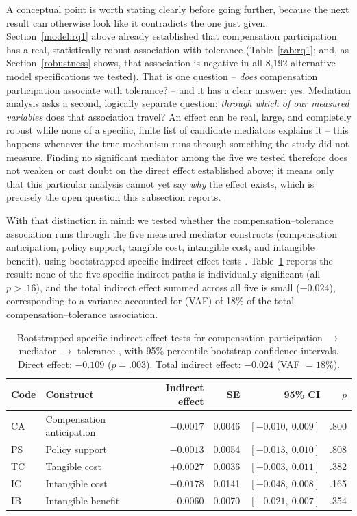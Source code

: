 A conceptual point is worth stating clearly before going further, because
the next result can otherwise look like it contradicts the one just given.
Section~\ref{model:rq1} above already established that compensation
participation has a real, statistically robust association with tolerance
(Table~\ref{tab:rq1}; and, as Section~\ref{robustness} shows, that association
is negative in all 8{,}192 alternative model specifications we tested). That
is one question -- \emph{does} compensation participation associate with
tolerance? -- and it has a clear answer: yes. Mediation analysis asks a
second, logically separate question: \emph{through which of our measured
variables} does that association travel? An effect can be real, large, and
completely robust while none of a specific, finite list of candidate
mediators explains it -- this happens whenever the true mechanism runs
through something the study did not measure. Finding no significant
mediator among the five we tested therefore does not weaken or cast doubt on
the direct effect established above; it means only that this particular
analysis cannot yet say \emph{why} the effect exists, which is precisely the
open question this subsection reports.

With that distinction in mind: we tested whether the compensation--tolerance
association runs through the five measured mediator constructs
(compensation anticipation, policy support, tangible cost, intangible cost,
and intangible benefit), using bootstrapped specific-indirect-effect tests
\citep{Nitzl2016}. Table~\ref{tab:mediation} reports the result: none of the
five specific indirect paths is individually significant (all $p > .16$),
and the total indirect effect summed across all five is small ($-0.024$),
corresponding to a variance-accounted-for (VAF) of 18\% of the total
compensation--tolerance association.

\begin{table}[htbp]
\centering
\caption{Bootstrapped specific-indirect-effect tests for compensation
participation $\rightarrow$ mediator $\rightarrow$ tolerance
\citep{Nitzl2016}, with 95\% percentile bootstrap confidence intervals.
Direct effect: $-0.109$ ($p=.003$). Total indirect effect: $-0.024$
(VAF $=18\%$).}
\label{tab:mediation}
\begin{tabular}{llrrrr}
\hline
\textbf{Code} & \textbf{Construct} & \textbf{Indirect effect} & \textbf{SE} & \textbf{95\% CI} & \textbf{$p$} \\
\hline
CA & Compensation anticipation & $-0.0017$ & 0.0046 & $[-0.010,\ 0.009]$ & .800 \\
PS & Policy support            & $-0.0013$ & 0.0054 & $[-0.013,\ 0.010]$ & .808 \\
TC & Tangible cost             & $+0.0027$ & 0.0036 & $[-0.003,\ 0.011]$ & .382 \\
IC & Intangible cost           & $-0.0178$ & 0.0141 & $[-0.048,\ 0.008]$ & .165 \\
IB & Intangible benefit        & $-0.0060$ & 0.0070 & $[-0.021,\ 0.007]$ & .354 \\
\hline
\end{tabular}
\end{table}

